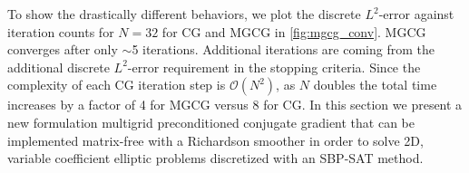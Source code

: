 To show the drastically different behaviors, we plot the discrete $\mathit{L}^2$-error against iteration counts for $N = 32$ for CG and MGCG in \autoref{fig:mgcg_conv}.
MGCG converges after only $\sim$5 iterations. Additional iterations are coming from the additional discrete $\mathit{L}^2$-error requirement in the stopping criteria.
Since the complexity of each CG iteration step is $\mathcal{O}(N^2)$, as $N$ doubles the total time increases by a factor of 4 for MGCG versus 8 for CG. 
In this section we present a new formulation multigrid preconditioned conjugate gradient that can be implemented matrix-free with a Richardson smoother in order to solve 2D, variable coefficient elliptic problems discretized with an SBP-SAT method. 



